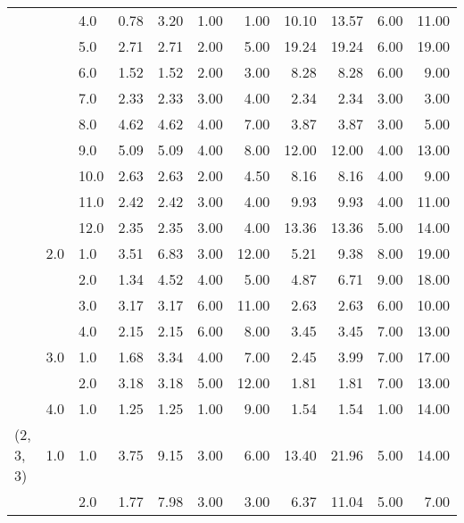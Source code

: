 \begin{tabular}{lllrrrrrrrr}
          &     & 4.0  &       0.78 &      3.20 &  1.00 &   1.00 &      10.10 &     13.57 &  6.00 &  11.00 \\
          &     & 5.0  &       2.71 &      2.71 &  2.00 &   5.00 &      19.24 &     19.24 &  6.00 &  19.00 \\
          &     & 6.0  &       1.52 &      1.52 &  2.00 &   3.00 &       8.28 &      8.28 &  6.00 &   9.00 \\
          &     & 7.0  &       2.33 &      2.33 &  3.00 &   4.00 &       2.34 &      2.34 &  3.00 &   3.00 \\
          &     & 8.0  &       4.62 &      4.62 &  4.00 &   7.00 &       3.87 &      3.87 &  3.00 &   5.00 \\
          &     & 9.0  &       5.09 &      5.09 &  4.00 &   8.00 &      12.00 &     12.00 &  4.00 &  13.00 \\
          &     & 10.0 &       2.63 &      2.63 &  2.00 &   4.50 &       8.16 &      8.16 &  4.00 &   9.00 \\
          &     & 11.0 &       2.42 &      2.42 &  3.00 &   4.00 &       9.93 &      9.93 &  4.00 &  11.00 \\
          &     & 12.0 &       2.35 &      2.35 &  3.00 &   4.00 &      13.36 &     13.36 &  5.00 &  14.00 \\
          & 2.0 & 1.0  &       3.51 &      6.83 &  3.00 &  12.00 &       5.21 &      9.38 &  8.00 &  19.00 \\
          &     & 2.0  &       1.34 &      4.52 &  4.00 &   5.00 &       4.87 &      6.71 &  9.00 &  18.00 \\
          &     & 3.0  &       3.17 &      3.17 &  6.00 &  11.00 &       2.63 &      2.63 &  6.00 &  10.00 \\
          &     & 4.0  &       2.15 &      2.15 &  6.00 &   8.00 &       3.45 &      3.45 &  7.00 &  13.00 \\
          & 3.0 & 1.0  &       1.68 &      3.34 &  4.00 &   7.00 &       2.45 &      3.99 &  7.00 &  17.00 \\
          &     & 2.0  &       3.18 &      3.18 &  5.00 &  12.00 &       1.81 &      1.81 &  7.00 &  13.00 \\
          & 4.0 & 1.0  &       1.25 &      1.25 &  1.00 &   9.00 &       1.54 &      1.54 &  1.00 &  14.00 \\
(2, 3, 3) & 1.0 & 1.0  &       3.75 &      9.15 &  3.00 &   6.00 &      13.40 &     21.96 &  5.00 &  14.00 \\
          &     & 2.0  &       1.77 &      7.98 &  3.00 &   3.00 &       6.37 &     11.04 &  5.00 &   7.00 \\

\end{tabular}
